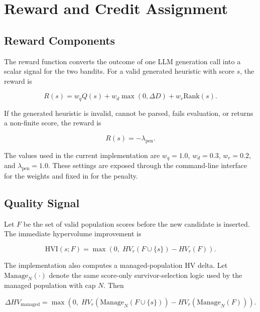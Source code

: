 \documentclass[../main.tex]{subfiles}
\begin{document}
\section{Reward and Credit Assignment}

\subsection{Reward Components}

The reward function converts the outcome of one LLM generation call into a scalar signal for the two bandits. For a valid generated heuristic with score $s$, the reward is

\begin{equation}
  R(s)
  =
  w_q Q(s)
  +
  w_d \max(0,\Delta D)
  +
  w_r \mathrm{Rank}(s).
  \label{eq:reward}
\end{equation}

If the generated heuristic is invalid, cannot be parsed, fails evaluation, or returns a non-finite score, the reward is

\begin{equation}
  R(s) = -\lambda_{\mathrm{pen}}.
\end{equation}

The values used in the current implementation are $w_q=1.0$, $w_d=0.3$, $w_r=0.2$, and $\lambda_{\mathrm{pen}}=1.0$. These settings are exposed through the command-line interface for the weights and fixed in  for the penalty.

\subsection{Quality Signal}

Let $F$ be the set of valid population scores before the new candidate is inserted. The immediate hypervolume improvement is

\begin{equation}
  \mathrm{HVI}(s;F)
  =
  \max\left(0,\;HV_r(F\cup\{s\})-HV_r(F)\right).
\end{equation}

The implementation also computes a managed-population HV delta. Let $\mathrm{Manage}_N(\cdot)$ denote the same score-only survivor-selection logic used by the managed population with cap $N$. Then

\begin{equation}
  \Delta HV_{\mathrm{managed}}
  =
  \max\left(
    0,\;
    HV_r(\mathrm{Manage}_N(F\cup\{s\}))
    -
    HV_r(\mathrm{Manage}_N(F))
  \right).
  \label{eq:managed-hv}
\end{equation}
\end{document}
